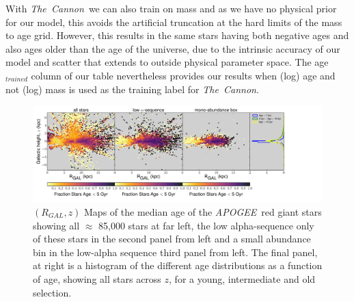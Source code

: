 \documentclass[12pt, preprint]{aastex}
\newcommand{\project}[1]{\textsl{#1}}
\newcommand{\tc}{\project{The~Cannon}}
\newcommand{\apogee}{\project{APOGEE}}
\begin{document}
With \tc\ we can also train on mass and as we have no physical prior for our model, this avoids the artificial truncation at the hard limits of the mass to age grid. However, this results in the same stars having both negative ages and also ages older than the age of the universe, due to the intrinsic accuracy of our model and scatter that extends to outside physical parameter space. The age$_{trained}$ column of our table nevertheless provides our results when (log) age and not (log) mass is used as the training label for \tc.

\begin{figure}[h!]
\centering
              \includegraphics[scale=0.43]{./plots/agealphamap_testcm.pdf}
    \caption{$(R_{GAL},z)$ Maps of the median age of the \apogee\  red giant stars showing all $\approx$ 85,000 stars at far left, the low alpha-sequence only of these stars in the second panel from left and a small abundance bin in the low-alpha sequence third panel from left. The final panel, at right is a histogram of the different age distributions as a function of age, showing all stars across $z$, for a young, intermediate and old selection.  }
\label{fig:allage}
\end{figure}
\end{document}
